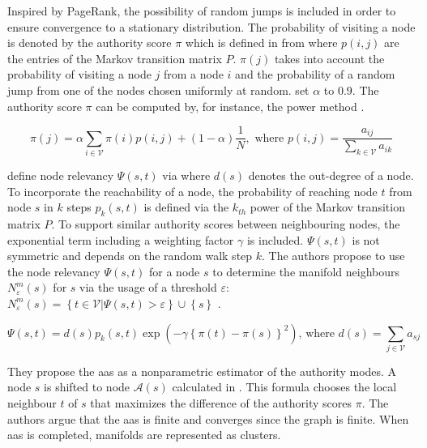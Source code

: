 Inspired by PageRank, the possibility of random jumps is included in order to ensure convergence to a stationary distribution. 
The probability of visiting a node is denoted by the authority score $\pi$ 
which is defined in  from \citet{mode_seeking_2012} 
where $p(i,j)$ are the entries of the Markov transition matrix $P$.
$\pi(j)$ takes into account the probability of visiting a node $j$ from a node $i$ and 
the probability of a random jump from one of the nodes chosen uniformly at random.
\citet{mode_seeking_2012} set $\alpha$ to $0.9$. 
The authority score $\pi$ can be computed by, for instance, the power method \citep{mode_seeking_2012,PageRank_2004}.

\begin{equation}
    \pi(j) = \alpha \sum_{i \in \mathcal{V}}^{}  \pi(i)p(i,j) + (1-\alpha)\frac{1}{N} , \text{ where } p(i,j) = \frac{a_{ij} }{\sum_{k \in \mathcal{V}}^{}a_{ik} } 
    \label{eq:authority_score}
\end{equation}

\citet{mode_seeking_2012} define node relevancy $\Psi(s,t)$ via  where $d(s)$ denotes the out-degree of a node.
To incorporate the reachability of a node, the probability of reaching node $t$ from node $s$ in $k$ steps $p_k(s,t)$ is 
defined via the $k_{th}$ power of the Markov transition matrix $P$.
To support similar authority scores between neighbouring nodes, the exponential term including a weighting factor $\gamma$ is included.
$\Psi(s,t)$ is not symmetric and depends on the random walk step $k$.
The authors propose to use the node relevancy $\Psi(s,t)$ for a node $s$ to determine the manifold neighbours $N_\varepsilon^m(s)$ for $s$ 
via the usage of a threshold $\varepsilon$: 
$N_\varepsilon^m(s) =  \left\{ t \in \mathcal{V} | \Psi(s,t) > \varepsilon \right\} \cup \left\{ s \right\}$ \citep{mode_seeking_2012}.

\begin{equation}
    \Psi(s,t) = d(s) p_k(s,t) \exp(-\gamma \left\{  \pi(t) - \pi(s)  \right\}^2)\text{, where } d(s) = \sum_{j\in \mathcal{V}}^{}a_{sj}
    \label{eq:node_relevancy}
\end{equation}

They propose the \ac{aas} as a nonparametric estimator of the authority modes.
A node $s$ is shifted to node $\mathcal{A}(s)$ calculated in . 
This formula chooses the local neighbour $t$ of $s$ that maximizes the difference of the authority scores $\pi$.
The authors argue that the \ac{aas} is finite and converges since the graph is finite.
When \ac{aas} is completed, manifolds are represented as clusters.

